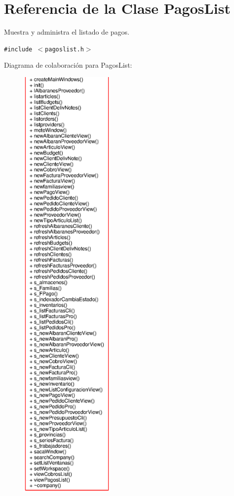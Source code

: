 \section{Referencia de la Clase Pagos\-List}
\label{classPagosList}
Muestra y administra el listado de pagos.  


{\tt \#include $<$pagoslist.h$>$}

Diagrama de colaboraci\'{o}n para Pagos\-List:\begin{figure}[H]
\begin{center}
\leavevmode
\includegraphics[width=131pt]{classPagosList__coll__graph}
\end{center}
\end{figure}
